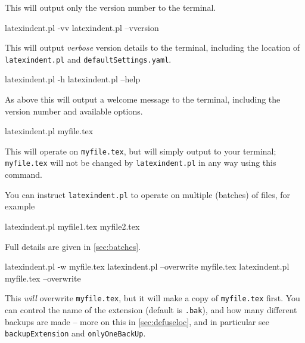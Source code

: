  This will output only the version number to the terminal.


 \begin{commandshell}
latexindent.pl -vv
latexindent.pl --vversion
\end{commandshell}

 This will output \emph{verbose} version details to the terminal, including the location
 of \texttt{latexindent.pl} and \texttt{defaultSettings.yaml}.


 \begin{commandshell}
latexindent.pl -h
latexindent.pl --help
\end{commandshell}

 As above this will output a welcome message to the terminal, including the version
 number and available options.

 \begin{commandshell}
latexindent.pl myfile.tex
\end{commandshell}

 This will operate on \texttt{myfile.tex}, but will simply output to your terminal;
 \texttt{myfile.tex} will not be changed by \texttt{latexindent.pl} in any way using this
 command.

 You can  instruct
 \texttt{latexindent.pl} to operate on multiple (batches) of files, for example

 \begin{commandshell}
latexindent.pl myfile1.tex myfile2.tex
\end{commandshell}

 Full details are given in \vref{sec:batches}.


 \begin{commandshell}
latexindent.pl -w myfile.tex
latexindent.pl --overwrite myfile.tex
latexindent.pl myfile.tex --overwrite 
\end{commandshell}

 This \emph{will} overwrite \texttt{myfile.tex}, but it will make a copy of
 \texttt{myfile.tex} first. You can control the name of the extension (default is
 \texttt{.bak}), and how many different backups are made -- more on this in
 \cref{sec:defuseloc}, and in particular see \texttt{backupExtension} and
 \texttt{onlyOneBackUp}.

